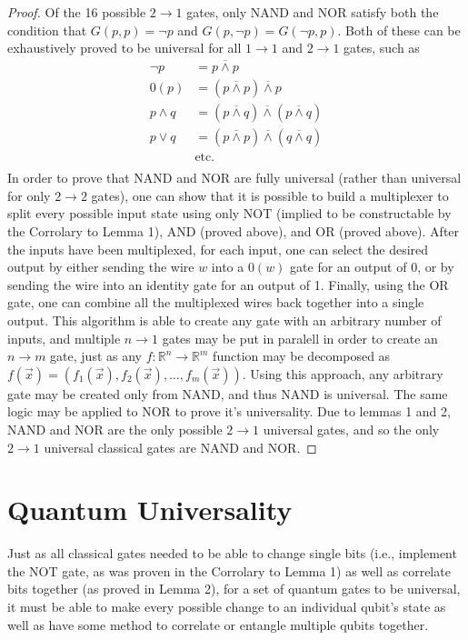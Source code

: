\documentclass[12pt]{article}
\newcommand{\nand}{\overline{\land}}
\begin{document}
\begin{proof}
    Of the 16 possible $2 \to 1$ gates, only NAND and NOR satisfy both the condition that $G(p, p) = \neg p$ and $G(p, \neg p) = G(\neg p, p)$.
    Both of these can be exhaustively proved to be universal for all $1 \to 1$ and $2 \to 1$ gates, such as
    \begin{align}
        \neg p &= p \nand p \\
        0(p) &= (p \nand p) \nand p \\
        p \land q &= (p \nand q) \nand (p \nand q) \\
        p \lor q &= (p \nand p) \nand (q \nand q) \\
        &\text{etc.} \\
    \end{align}
    In order to prove that NAND and NOR are fully universal (rather than universal for only $2 \to 2$ gates), one can show that it is possible to build a multiplexer to split every possible input state using only NOT (implied to be constructable by the Corrolary to Lemma 1), AND (proved above), and OR (proved above). After the inputs have been multiplexed, for each input, one can select the desired output by either sending the wire $w$ into a $0(w)$ gate for an output of 0, or by sending the wire into an identity gate for an output of 1. Finally, using the OR gate, one can combine all the multiplexed wires back together into a single output.
    This algorithm is able to create any gate with an arbitrary number of inputs, and multiple $n \to 1$ gates may be put in paralell in order to create an $n \to m$ gate, just as any $f: \mathbb{R}^n \to \mathbb{R}^m$ function may be decomposed as $f(\overrightarrow{x}) = (f_1(\overrightarrow{x}), f_2(\overrightarrow{x}), \dots, f_m(\overrightarrow{x}))$.
    Using this approach, any arbitrary gate may be created only from NAND, and thus NAND is universal. The same logic may be applied to NOR to prove it's universality. Due to lemmas 1 and 2, NAND and NOR are the only possible $2 \to 1$ universal gates, and so the only $2 \to 1$ universal classical gates are NAND and NOR.
\end{proof}

\section{Quantum Universality}
Just as all classical gates needed to be able to change single bits (i.e., implement the NOT gate, as was proven in the Corrolary to Lemma 1) as well as correlate bits together (as proved in Lemma 2), for a set of quantum gates to be universal, it must be able to make every possible change to an individual qubit's state as well as have some method to correlate or entangle multiple qubits together.
\end{document}
